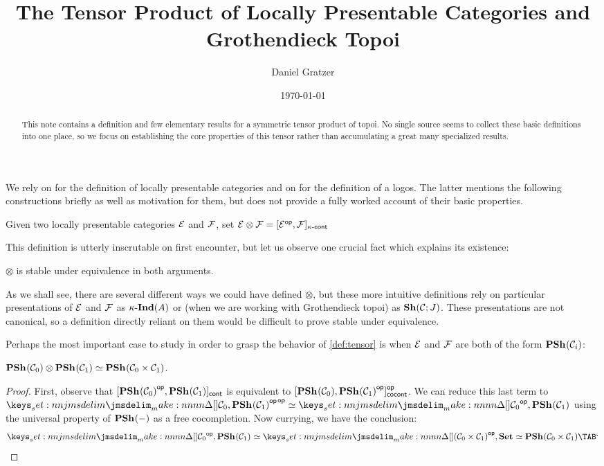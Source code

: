 \documentclass[reqno]{amsart}
\title{The Tensor Product of Locally Presentable Categories and Grothendieck Topoi}
\author{Daniel Gratzer}
\date{\today}
\begin{document}
\begin{abstract}
  This note contains a definition and few elementary results for a symmetric tensor product of
  topoi. No single source seems to collect these basic definitions into one place, so we focus on
  establishing the core properties of this tensor rather than accumulating a great many specialized
  results.
\end{abstract}

\maketitle

We rely on \textcite{adamek-rosicky:1994} for the definition of locally presentable categories and
on \textcite{anel:2019} for the definition of a logos. The latter mentions the following
constructions briefly as well as motivation for them, but does not provide a fully worked account of
their basic properties.

\begin{definition}
  \label{def:tensor}
  Given two locally presentable categories $\mathcal{E}$ and $\mathcal{F}$, set
  $\EE \otimes \FF = \Cont[\kappa]{\Op{\EE}}{\FF}$
\end{definition}

This definition is utterly inscrutable on first encounter, but let us observe one crucial fact
which explains its existence:

\begin{theorem}
  \label{def:stable}
  $\otimes$ is stable under equivalence in both arguments.
\end{theorem}

As we shall see, there are several different ways we could have defined $\otimes$, but these more
intuitive definitions rely on particular presentations of $\mathcal{E}$ and $\mathcal{F}$ as
$\Ind[\kappa](A)$ or (when we are working with Grothendieck topoi) as $\SH{\CC}[J]$. These
presentations are not canonical, so a definition directly reliant on them would be difficult to
prove stable under equivalence.

Perhaps the most important case to study in order to grasp the behavior of \cref{def:tensor} is when
$\mathcal{E}$ and $\mathcal{F}$ are both of the form $\PSH{\CC_i}$:
\begin{example}
  $\PSH{\CC_0} \otimes \PSH{\CC_1} \Equiv \PSH{\CC_0 \times \CC_1}$.
\end{example}
\begin{proof}
  First, observe that $\Cont{\Op{\PSH{\CC_0}}}{\PSH{\CC_1}}$ is equivalent to
  $\Manual{[\PSH{\CC_0},\Op{\PSH{\CC_1}}]^{\mathsf{op}}_{\mathsf{cocont}}}$. We can reduce this last term to
  $\Op{\Hom{\CC_0}{\Op{\PSH{\CC_1}}}} \Equiv \Hom{\Op{\CC_0}}{\PSH{\CC_1}}$ using the universal
  property of $\PSH{-}$ as a free cocompletion. Now currying, we have the conclusion:
  \[
    \Hom{\Op{\CC_0}}{\PSH{\CC_1}}
    \Equiv \Hom{\Op{(\CC_0 \times \CC_1)}}{\SET}
    \Equiv \PSH{\CC_0 \times \CC_1} \qedhere
  \]
\end{proof}
\end{document}
